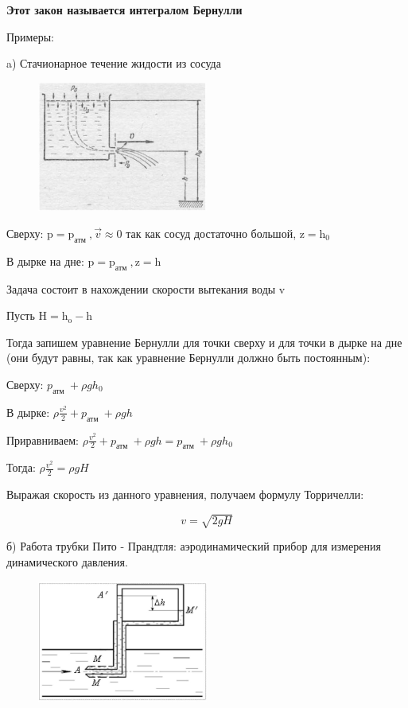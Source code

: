 \textbf{Этот закон называется интегралом Бернулли}


Примеры:


a) Стачионарное течение жидости из сосуда
\begin{figure}[h!]
    \centering
    \includegraphics[width=0.5\textwidth]{2023_05_21_6e9b4e8657e82b213c6ag-15}
\end{figure}


Сверху: $\mathrm{p}=\mathrm{p}_{\text {атм }}, \vec{v} \approx 0$ так как сосуд достаточно большой, $\mathrm{z}=\mathrm{h}_{0}$

В дырке на дне: $\mathrm{p}=\mathrm{p}_{\text {атм }}, \mathrm{z}=\mathrm{h}$

Задача состоит в нахождении скорости вытекания воды $\mathrm{v}$

Пусть $\mathrm{H}=\mathrm{h}_{\mathrm{o}}-\mathrm{h}$

Тогда запишем уравнение Бернулли для точки сверху и для точки в дырке на дне (они будут равны, так как уравнение Бернулли должно быть постоянным):

Сверху: $p_{\text {атм }}+\rho g h_{0}$

В дырке: $\rho \frac{v^{2}}{2}+p_{\text {атм }}+\rho g h$

Приравниваем: $\rho \frac{v^{2}}{2}+p_{\text {атм }}+\rho g h=p_{\text {атм }}+\rho g h_{0}$

Тогда: $\rho \frac{v^{2}}{2}=\rho g H$

Выражая скорость из данного уравнения, получаем формулу Торричелли:

$$
v=\sqrt{2 g H}
$$

б) Работа трубки Пито - Прандтля: аэродинамический прибор для измерения динамического давления.

\begin{figure}[h!]
    \centering
    \includegraphics[width=0.5\textwidth]{2023_05_21_6e9b4e8657e82b213c6ag-16(1)}
\end{figure}

